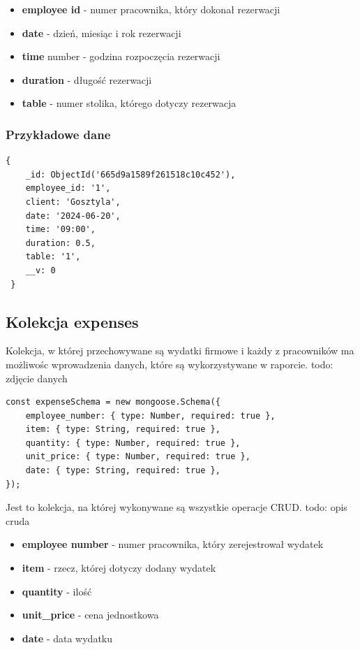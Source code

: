 \documentclass[12pt]{article}
\begin{document}
\begin{itemize}
	\item \textbf{employee id} - numer pracownika, który dokonał rezerwacji
	\item \textbf{date} - dzień, miesiąc i rok rezerwacji
	\item \textbf{time} number - godzina rozpoczęcia rezerwacji
	\item \textbf{duration} - długość rezerwacji
	\item \textbf{table} - numer stolika, którego dotyczy rezerwacja
\end{itemize}

\subsubsection{Przykładowe dane}
\begin{lstlisting}[]
 {
	_id: ObjectId('665d9a1589f261518c10c452'),
    employee_id: '1',
    client: 'Gosztyla',
    date: '2024-06-20',
    time: '09:00',
    duration: 0.5,
    table: '1',
    __v: 0
 }
\end{lstlisting}

\newpage
\begin{samepage}
\subsection{Kolekcja expenses}
Kolekcja, w której przechowywane są wydatki firmowe i każdy z pracowników ma możliwośc wprowadzenia danych, które są wykorzystywane w raporcie.
todo: zdjęcie danych
\begin{lstlisting}[caption={Expenses}]
const expenseSchema = new mongoose.Schema({
	employee_number: { type: Number, required: true },
	item: { type: String, required: true },
	quantity: { type: Number, required: true },
	unit_price: { type: Number, required: true },
	date: { type: String, required: true },
});
\end{lstlisting}
Jest to kolekcja, na której wykonywane są wszystkie operacje CRUD.
todo: opis cruda
\end{samepage}

\begin{itemize}
	\item \textbf{employee number} - numer pracownika, który zerejestrował wydatek
	\item \textbf{item} - rzecz, której dotyczy dodany wydatek
	\item \textbf{quantity} - ilość 
	\item \textbf{unit\_price} - cena jednostkowa
	\item \textbf{date} - data wydatku
\end{itemize}
\end{document}
